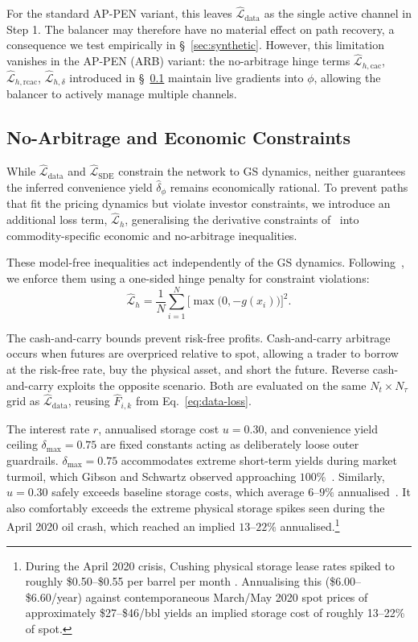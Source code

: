 \documentclass[11pt, a4paper]{article}
\begin{document}
For the standard AP-PEN variant, this leaves $\hat{\mathcal{L}}_{\text{data}}$ as the single active channel in Step 1. The balancer may therefore have no material effect on path recovery, a consequence we test empirically in \S~\ref{sec:synthetic}. However, this limitation vanishes in the AP-PEN (ARB) variant: the no-arbitrage hinge terms $\hat{\mathcal{L}}_{h,\text{cac}}$, $\hat{\mathcal{L}}_{h,\text{rcac}}$, $\hat{\mathcal{L}}_{h,\delta}$ introduced in \S~\ref{sec:constraints} maintain live gradients into $\phi$, allowing the balancer to actively manage multiple channels.

\subsection{No-Arbitrage and Economic Constraints}
\label{sec:constraints}
While $\hat{\mathcal{L}}_{\text{data}}$ and $\hat{\mathcal{L}}_{\text{SDE}}$ constrain the network to GS dynamics, neither guarantees the inferred convenience yield $\hat{\delta}_{\phi}$ remains economically rational. To prevent paths that fit the pricing dynamics but violate investor constraints, we introduce an additional loss term, $\hat{\mathcal{L}}_{h}$, generalising the derivative constraints of~\cite{Hoshisashi2024Physics-InformedPDEs} into commodity-specific economic and no-arbitrage inequalities.

These model-free inequalities act independently of the GS dynamics. Following~\cite{zhang2025exact}, we enforce them using a one-sided hinge penalty for constraint violations:
\begin{equation}
\hat{\mathcal{L}}_h = \frac{1}{N} \sum_{i=1}^{N}
\big[ \max\!\big(0, -g(x_i)\big) \big]^2.
\label{eq:hinge}
\end{equation}

The cash-and-carry bounds prevent risk-free profits. Cash-and-carry arbitrage occurs when futures are overpriced relative to spot, allowing a trader to borrow at the risk-free rate, buy the physical asset, and short the future. Reverse cash-and-carry exploits the opposite scenario. Both are evaluated on the same $N_t \times N_\tau$ grid as $\hat{\mathcal{L}}_{\text{data}}$, reusing $\hat{F}_{i,k}$ from Eq.~\ref{eq:data-loss}.

The interest rate $r$, annualised storage cost $u = 0.30$, and convenience yield ceiling $\delta_{\max} = 0.75$ are fixed constants acting as deliberately loose outer guardrails. $\delta_{\max} = 0.75$ accommodates extreme short-term yields during market turmoil, which Gibson and Schwartz observed approaching $100\%$~\cite{Gibson1990StochasticClaims}. Similarly, $u = 0.30$ safely exceeds baseline storage costs, which average $6$--$9\%$ annualised~\cite{stancu2021dynamics, Fama1987CommodityStorage, byun2017speculation}. It also comfortably exceeds the extreme physical storage spikes seen during the April 2020 oil crash, which reached an implied $13$--$22\%$ annualised.\footnote{During the April 2020 crisis, Cushing physical storage lease rates spiked to roughly \$0.50--\$0.55 per barrel per month \cite{CME2020, Reuters2020}. Annualising this (\$6.00--\$6.60/year) against contemporaneous March/May 2020 spot prices of approximately \$27--\$46/bbl yields an implied storage cost of roughly 13--22\% of spot.}
\end{document}
